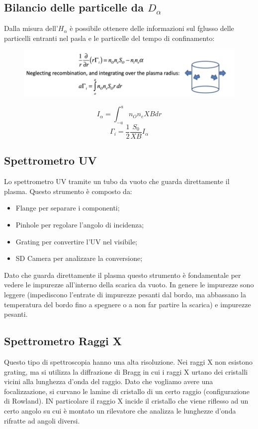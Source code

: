 \documentclass{article}
\begin{document}
\subsection{Bilancio delle particelle da \(D_{\alpha } \)}
Dalla misura dell'\(H_{\alpha}\) è possibile ottenere delle informazioni sul fglusso delle particelli entranti nel pasla e le particelle del tempo di confinamento:
\begin{figure}
	\includegraphics[scale=0.4]{2022-06-22-11-18-56.png}%
\end{figure}
\begin{equation*}
	I_{\alpha}=\int_{-a}^{a}n_{O}n_{e}X B dr
\end{equation*}
\begin{equation*}
	\Gamma_{i}=\frac{1}{2}\frac{S_{0}}{X B}I_{\alpha}
\end{equation*}
\subsection{Spettrometro UV}
Lo spettrometro UV tramite un tubo da vuoto che guarda direttamente il plasma. Questo strumento è composto da:\begin{itemize}
	\item Flange per separare i componenti;
	\item Pinhole per regolare l'angolo di incidenza;
	\item Grating per convertire l'UV nel visibile;
	\item SD Camera per analizzare la conversione;
\end{itemize}
Dato che guarda direttamente il plasma questo strumento è fondamentale per vedere le impurezze all'interno della scarica da vuoto. In genere le impurezze sono leggere (impediscono l'entrate di impurezze pesanti dal bordo, ma abbassano la temperatura del bordo fino a spegnere o a non far partire la scarica) e impurezze pesanti.
\subsection{Spettrometro Raggi X}
Questo tipo di spettroscopia hanno una alta risoluzione. Nei raggi X non esistono grating, ma si utilizza la diffrazione di Bragg in cui i raggi X urtano dei cristalli vicini alla lunghezza d'onda del raggio. Dato che vogliamo avere una focalizzazione, si curvano le lamine di cristallo di un certo raggio (configurazione di Rowland). IN particolare il raggio X incide il cristallo che viene riflesso ad un certo angolo su cui è montato un rilevatore che analizza le lunghezze d'onda rifratte ad angoli diversi.
\end{document}
